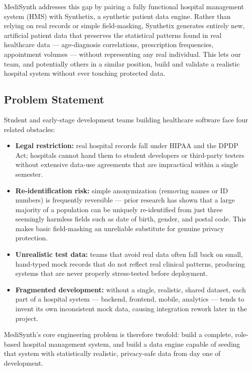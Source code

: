 \documentclass[12pt,a4paper]{report}
\begin{document}
MediSynth addresses this gap by pairing a fully functional hospital management system (HMS) with Synthetix, a synthetic patient data engine. Rather than relying on real records or simple field-masking, Synthetix generates entirely new, artificial patient data that preserves the statistical patterns found in real healthcare data --- age-diagnosis correlations, prescription frequencies, appointment volumes --- without representing any real individual. This lets our team, and potentially others in a similar position, build and validate a realistic hospital system without ever touching protected data.

\subsection{Problem Statement}

Student and early-stage development teams building healthcare software face four related obstacles:

\begin{itemize}[leftmargin=*]
    \item \textbf{Legal restriction:} real hospital records fall under HIPAA and the DPDP Act; hospitals cannot hand them to student developers or third-party testers without extensive data-use agreements that are impractical within a single semester.
    \item \textbf{Re-identification risk:} simple anonymization (removing names or ID numbers) is frequently reversible --- prior research has shown that a large majority of a population can be uniquely re-identified from just three seemingly harmless fields such as date of birth, gender, and postal code. This makes basic field-masking an unreliable substitute for genuine privacy protection.
    \item \textbf{Unrealistic test data:} teams that avoid real data often fall back on small, hand-typed mock records that do not reflect real clinical patterns, producing systems that are never properly stress-tested before deployment.
    \item \textbf{Fragmented development:} without a single, realistic, shared dataset, each part of a hospital system --- backend, frontend, mobile, analytics --- tends to invent its own inconsistent mock data, causing integration rework later in the project.
\end{itemize}

MediSynth's core engineering problem is therefore twofold: build a complete, role-based hospital management system, and build a data engine capable of seeding that system with statistically realistic, privacy-safe data from day one of development.
\end{document}
